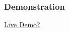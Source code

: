   \begin{frame}
    \frametitle{Demonstration}
    \centering
    \href{https://asciinema.org/a/86989}{\HUGE Live Demo?}
  \end{frame}
